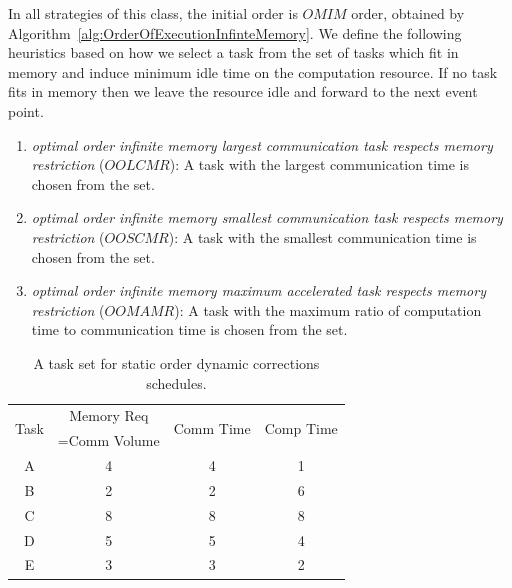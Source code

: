\documentclass[sigconf]{acmart}
\begin{document}
	In all strategies of this class, the initial order is $OMIM$ order,  obtained by Algorithm~\ref{alg:OrderOfExecutionInfinteMemory}. We define the following heuristics based on how we select a task from the set of tasks which fit in memory and induce minimum idle time on the computation resource. If no task fits in memory then we leave the resource idle and forward to the next event point.
	
	\begin{enumerate}[label=\roman*)]
		\item \textit{optimal order infinite memory largest communication task respects memory restriction} ($OOLCMR$): A task with the largest communication time is chosen from the set.
		\item \textit{optimal order infinite memory smallest communication task respects memory restriction} ($OOSCMR$): A task with the smallest communication time is chosen from the set.
		\item \textit{optimal order infinite memory maximum accelerated task respects memory restriction} ($OOMAMR$): A task  with the maximum ratio of computation time to communication time is chosen from the set.
	\end{enumerate}
	
	\begin{table}[htb]
		\begin{center}
			
			\begin{tabular}{|c|c|c|c|}
				\hline
				\multirow{2}{*}{Task} & Memory Req & \multirow{2}{*}{Comm Time} & \multirow{2}{*}{Comp Time}\\  
				&=Comm Volume && \\ \hline
				A & 4 & 4 &  1\\ \hline
				B & 2 & 2 & 6\\ \hline
				C & 8 & 8 & 8\\ \hline
				D & 5 & 5 & 4\\ \hline
				E & 3 & 3 & 2\\ \hline
			\end{tabular}
			\caption{\label{tab:staticOrderDynamicCorrectionsExample} A task set for static order dynamic corrections schedules.}
		\end{center}
	\end{table}
	
\end{document}
